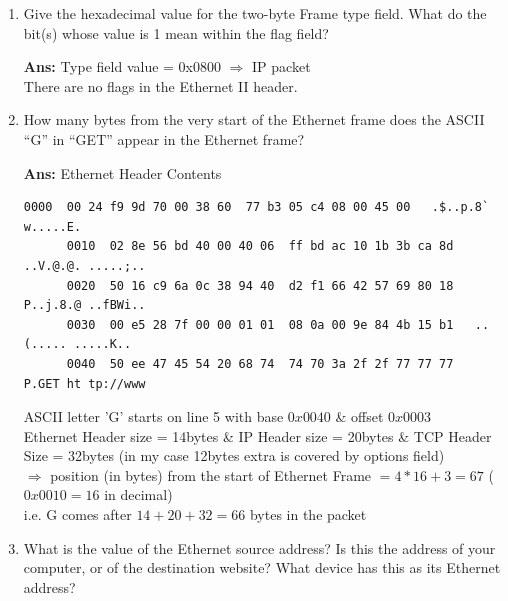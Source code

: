 \documentclass[a4,11pt]{article}
\newenvironment{que}
{ \color{YellowGreen}
  \begin{question}
}
{ \end{question} }
\newenvironment{sol}
{ \color{Black}
  \begin{solution}
}
{ \end{solution} }
\begin{document}
\begin{enumerate}
  \item
  \begin{que}
   Give the hexadecimal value for the two-byte Frame type field. What do the bit(s) whose value is 1 mean within the flag field?
  \end{que}
  
  \begin{sol}
   \textbf{Ans:} Type field value = 0x0800 $\Rightarrow$ IP packet \\
	    There are no flags in the Ethernet II header.
  \end{sol}
  
  \item 
  \begin{que}
   How many bytes from the very start of the Ethernet frame does the ASCII “G” in “GET” appear in the Ethernet frame?
  \end{que}

  \begin{sol}
   \textbf{Ans:} Ethernet Header Contents
   \begin{adjustwidth}{-2cm}{}
    \begin{lstlisting}[style=bash]
      0000  00 24 f9 9d 70 00 38 60  77 b3 05 c4 08 00 45 00   .$..p.8` w.....E.
      0010  02 8e 56 bd 40 00 40 06  ff bd ac 10 1b 3b ca 8d   ..V.@.@. .....;..
      0020  50 16 c9 6a 0c 38 94 40  d2 f1 66 42 57 69 80 18   P..j.8.@ ..fBWi..
      0030  00 e5 28 7f 00 00 01 01  08 0a 00 9e 84 4b 15 b1   ..(..... .....K..
      0040  50 ee 47 45 54 20 68 74  74 70 3a 2f 2f 77 77 77   P.GET ht tp://www
    \end{lstlisting}
    \end{adjustwidth}
    
    ASCII letter 'G' starts on line 5 with base $0x0040$ \& offset $0x0003$ \\
    Ethernet Header size = 14bytes \& IP Header size = 20bytes \& TCP Header Size = 32bytes (in my case 12bytes extra is covered by options field) \\
    $\Rightarrow$ position (in bytes) from the start of Ethernet Frame $= 4*16+3 = 67$ ($0x0010 = 16$ in decimal) \\
    i.e. G comes after $14+20+32 = 66$ bytes in the packet   
  \end{sol}

  \item 
  \begin{que}
   What is the value of the Ethernet source address? 
   Is this the address of your computer, or of the destination website?  What device has this as its Ethernet address?
  \end{que}


\end{enumerate}
\end{document}
